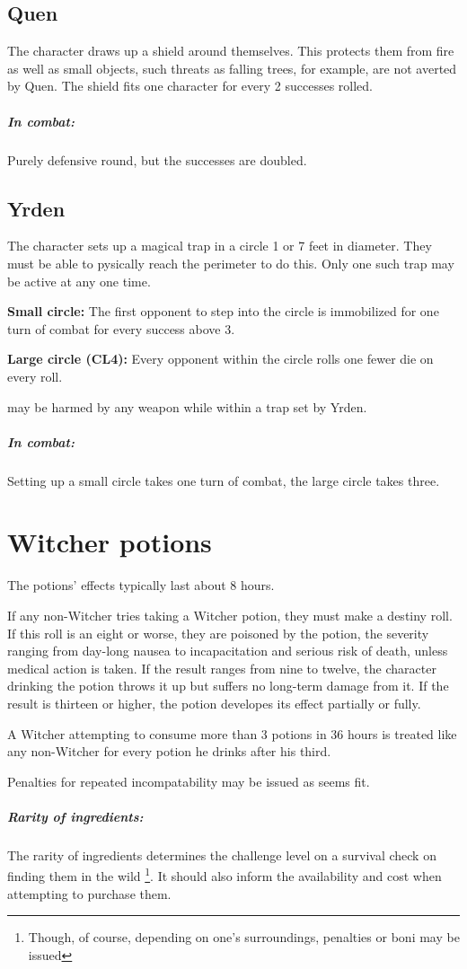 \documentclass[parskip=full,11pt]{scrreport}
\begin{document}
\subsection{Quen}
The character draws up a shield around themselves. This protects them from fire as well as small objects, such threats as
falling trees, for example, are not averted by Quen. The shield fits one character for every 2 successes rolled.

\subparagraph{In combat:} Purely defensive round, but the successes are doubled.

\subsection{Yrden}
The character sets up a magical trap in a circle 1 or 7 feet in diameter. They must be able to pysically reach the perimeter to do this. Only one such trap may be active at any one time.

\textbf{Small circle:} The first opponent to step into the circle is immobilized for one turn of combat for every success above 3.

\textbf{Large circle (CL4):} Every opponent within the circle rolls one fewer die on every roll.

 may be harmed by any weapon while within a trap set by Yrden.

\subparagraph{In combat:} Setting up a small circle takes one turn of combat, the large circle takes three.

\section{Witcher potions}\label{rule:witcher_potions}
The potions' effects typically last about 8 hours.

If any non-Witcher tries taking a Witcher potion, they must make a destiny roll. If this roll is an eight or worse,
they are poisoned by the potion, the severity ranging from day-long nausea to incapacitation and serious risk of death,
unless medical action is taken. If the result ranges from nine to twelve, the character drinking the potion throws it
up but suffers no long-term damage from it. If the result is thirteen or higher, the potion developes its effect
partially or fully.

A Witcher attempting to consume more than 3 potions in 36 hours is treated like any non-Witcher for every potion he drinks
after his third.

Penalties for repeated incompatability may be issued as seems fit.
\\[2ex]
\subparagraph{Rarity of ingredients:}
The rarity of ingredients determines the challenge level on a survival check on finding them in the wild%
\footnote{Though, of course, depending on one's surroundings, penalties or boni may be issued}.
It should also inform the availability and cost when attempting to purchase them.
\end{document}
